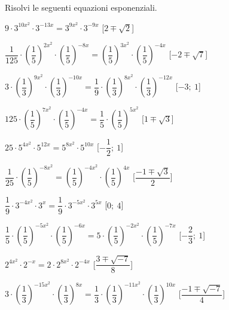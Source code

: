 \begin{esercizio}\label{ese:}
 Risolvi le seguenti equazioni esponenziali.
 \begin{enumeratea}
  \item  \(9 \cdot 3^{{10x^2}} \cdot 3^{{-13x}} = 3^{{9x^2}} \cdot 
3^{{-9x}}\)
   \hfill [\(2 \mp \sqrt{2}\)]
  \item  \(\dfrac{1}{125} \cdot \left(\dfrac{1}{5}\right)^{{2x^2}} \cdot 
\left(\dfrac{1}{5}\right)^{{-8x}} = \left(\dfrac{1}{5}\right)^{{3x^2}} 
\cdot 
\left(\dfrac{1}{5}\right)^{{-4x}}\)
   \hfill [\(-2 \mp \sqrt{7}\)]
  \item  \(3 \cdot \left(\dfrac{1}{3}\right)^{{9x^2}} \cdot 
\left(\dfrac{1}{3}\right)^{{-10x}} = \dfrac{1}{9} \cdot 
\left(\dfrac{1}{3}\right)^{{8x^2}} \cdot 
\left(\dfrac{1}{3}\right)^{{-12x}}\)
   \hfill [\(-3;~1\)]
  \item  \(125 \cdot \left(\dfrac{1}{5}\right)^{{7x^2}} \cdot 
\left(\dfrac{1}{5}\right)^{{-4x}} = \dfrac{1}{5} \cdot 
\left(\dfrac{1}{5}\right)^{{5x^2}}\)
   \hfill [\(1 \mp \sqrt{3}\)]
  \item  \(25 \cdot 5^{{4x^2}} \cdot 5^{{12x}} = 5^{{8x^2}} \cdot 
5^{{10x}}\)
   \hfill [\(-\dfrac{1}{2};~1\)]
  \item  \(\dfrac{1}{25} \cdot \left(\dfrac{1}{5}\right)^{{-8x^2}} = 
\left(\dfrac{1}{5}\right)^{{-4x^2}} \cdot \left(\dfrac{1}{5}\right)^{{4x}}\)
   \hfill [\(\dfrac{-1 \mp \sqrt{3}} 2\)]
  \item  \(\dfrac{1}{9} \cdot 3^{{-4x^2}} \cdot 3^{{x}} = \dfrac{1}{9} 
\cdot 
3^{{-5x^2}} \cdot 3^{{5x}}\)
   \hfill [\(0;~4\)]
  \item  \(\dfrac{1}{5} \cdot \left(\dfrac{1}{5}\right)^{{-5x^2}} \cdot 
\left(\dfrac{1}{5}\right)^{{-6x}} = 5 \cdot 
\left(\dfrac{1}{5}\right)^{{-2x^2}} 
\cdot \left(\dfrac{1}{5}\right)^{{-7x}}\)
   \hfill [\(-\dfrac{2}{3};~1\)]
  \item  \(2^{{4x^2}} \cdot 2^{{-x}} = 2 \cdot 2^{{8x^2}} \cdot 2^{{-4x}}\)
   \hfill [\(\dfrac{3 \mp \sqrt{-7}} 8\)]
  \item  \(3 \cdot \left(\dfrac{1}{3}\right)^{{-15x^2}} \cdot 
\left(\dfrac{1}{3}\right)^{{8x}} = \dfrac{1}{3} \cdot 
\left(\dfrac{1}{3}\right)^{{-11x^2}} \cdot 
\left(\dfrac{1}{3}\right)^{{10x}}\)
   \hfill [\(\dfrac{-1 \mp \sqrt{-7}} 4\)]
 \end{enumeratea}
\end{esercizio}


